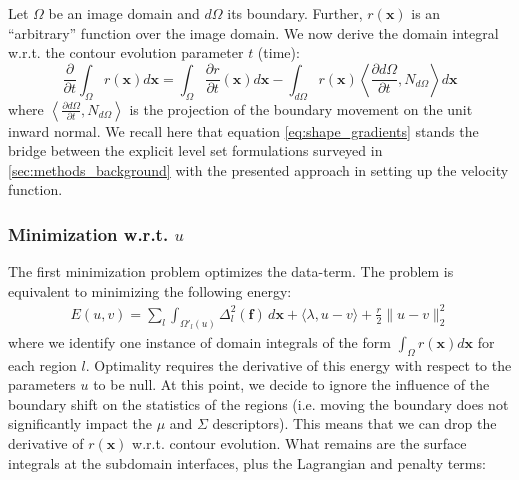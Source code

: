 Let $\Omega$ be an image domain and $d\Omega$ its boundary. Further, $r(\mathbf{x})$ 
is an ``arbitrary'' function over the image domain. We now derive the domain 
integral w.r.t. the contour evolution parameter $t$ (time):
\begin{equation}
\frac{\partial}{\partial t} \int_\Omega r(\mathbf{x}) d\mathbf{x} = \int_\Omega \frac{\partial r}{\partial t}(\mathbf{x}) d\mathbf{x} - \int_{d\Omega} r(\mathbf{x}) \left\langle \frac{\partial{d\Omega}}{\partial t}, N_{d\Omega}\right\rangle d\mathbf{x}
\label{eq:shape_gradients}
\end{equation}
where $\left\langle\frac{\partial{d\Omega}}{\partial t}, N_{d\Omega}\right\rangle$ is 
the projection of the boundary movement on the unit inward normal. We recall
here that equation \eqref{eq:shape_gradients} stands the bridge between the 
explicit level set formulations surveyed in \autoref{sec:methods_background} 
with the presented approach in setting up the velocity function.


\subsubsection{Minimization w.r.t. $u$}
The first minimization problem optimizes the data-term. The problem is equivalent 
to minimizing the following energy:
\begin{multline}
E(u,v) = \sum\limits_l \int_{\Omega'_l(u)} \Delta^2_l (\mathbf{f}) \,d\mathbf{x}
+ \langle \lambda, u-v \rangle + \frac{r}{2} \| u - v \|_2^2
\end{multline}
where we identify one instance of domain integrals of the form $\int_\Omega r(\mathbf{x}) 
d\mathbf{x}$ for each region $l$. Optimality requires the derivative of this energy 
with respect to the parameters $u$ to be null. At this point, we decide to ignore 
the influence of the boundary shift on the statistics of the regions (i.e. moving the 
boundary does not significantly impact the $\mu$ and $\Sigma$ descriptors). This means 
that we can drop the derivative of $r(\mathbf{x})$ w.r.t. contour evolution. 
What remains are the surface integrals at the subdomain interfaces, plus the Lagrangian 
and penalty terms:

